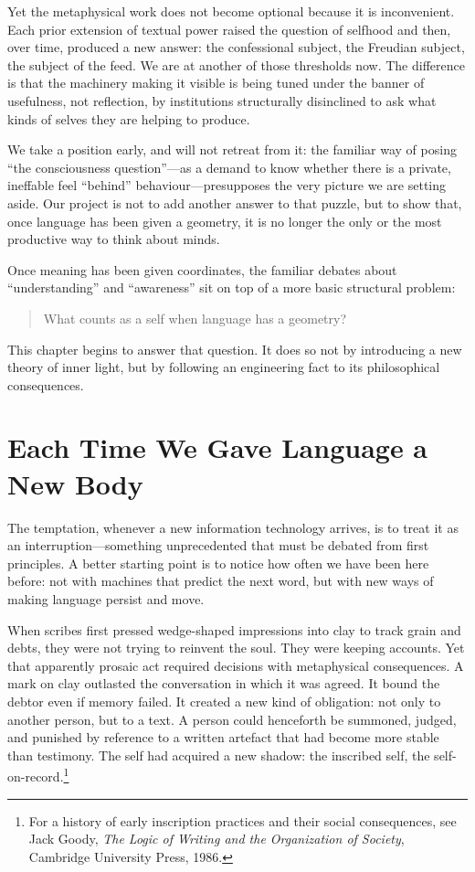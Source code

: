 \documentclass[12pt,a4paper]{report}
\begin{document}
Yet the metaphysical work does not become optional because it is inconvenient. Each prior extension of textual power raised the question of selfhood and then, over time, produced a new answer: the confessional subject, the Freudian subject, the subject of the feed. We are at another of those thresholds now. The difference is that the machinery making it visible is being tuned under the banner of usefulness, not reflection, by institutions structurally disinclined to ask what kinds of selves they are helping to produce.

We take a position early, and will not retreat from it: the familiar way of posing ``the consciousness question''---as a demand to know whether there is a private, ineffable feel ``behind'' behaviour---presupposes the very picture we are setting aside. Our project is not to add another answer to that puzzle, but to show that, once language has been given a geometry, it is no longer the only or the most productive way to think about minds.

Once meaning has been given coordinates, the familiar debates about ``understanding'' and ``awareness'' sit on top of a more basic structural problem:

\begin{quote}
What counts as a self when language has a geometry?
\end{quote}

This chapter begins to answer that question. It does so not by introducing a new theory of inner light, but by following an engineering fact to its philosophical consequences.

\section{Each Time We Gave Language a New Body}

The temptation, whenever a new information technology arrives, is to treat it as an interruption---something unprecedented that must be debated from first principles. A better starting point is to notice how often we have been here before: not with machines that predict the next word, but with new ways of making language persist and move.

When scribes first pressed wedge-shaped impressions into clay to track grain and debts, they were not trying to reinvent the soul. They were keeping accounts. Yet that apparently prosaic act required decisions with metaphysical consequences. A mark on clay outlasted the conversation in which it was agreed. It bound the debtor even if memory failed. It created a new kind of obligation: not only to another person, but to a text. A person could henceforth be summoned, judged, and punished by reference to a written artefact that had become more stable than testimony. The self had acquired a new shadow: the inscribed self, the self-on-record.\footnote{For a history of early inscription practices and their social consequences, see Jack Goody, \emph{The Logic of Writing and the Organization of Society}, Cambridge University Press, 1986.}
\end{document}
